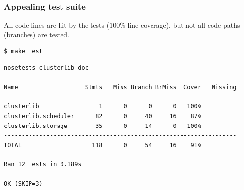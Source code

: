 \documentclass[11pt,compress,serif]{beamer}
\begin{document}
{    
 
}


\begin{frame}[fragile=singleslide]
\frametitle{Appealing test suite}


All code lines are hit by the
tests ($100\%$ line coverage), but not all code paths (branches) are tested.

\begin{verbatim}
$ make test 
\end{verbatim}    
\begin{verbatim}
nosetests clusterlib doc

Name                   Stmts   Miss Branch BrMiss  Cover   Missing
------------------------------------------------------------------
clusterlib                 1      0      0      0   100%   
clusterlib.scheduler      82      0     40     16    87%   
clusterlib.storage        35      0     14      0   100%   
------------------------------------------------------------------
TOTAL                    118      0     54     16    91%   
------------------------------------------------------------------
Ran 12 tests in 0.189s

OK (SKIP=3)
\end{verbatim}    


\end{frame}

\end{document}
